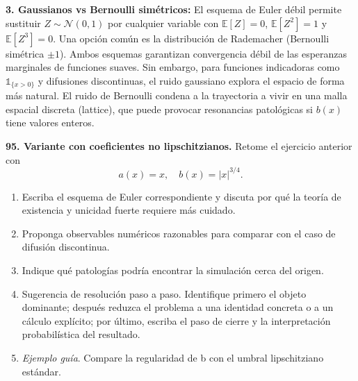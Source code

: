 \documentclass[11pt, letterpaper]{article}
\begin{document}
\begin{solucion}
    \textbf{3. Gaussianos vs Bernoulli simétricos:}
    El esquema de Euler débil permite sustituir $Z \sim \mathcal{N}(0,1)$ por cualquier variable con $\mathbb{E}[Z]=0$, $\mathbb{E}[Z^2]=1$ y $\mathbb{E}[Z^3]=0$. Una opción común es la distribución de Rademacher (Bernoulli simétrica $\pm 1$).
    Ambos esquemas garantizan convergencia débil de las esperanzas marginales de funciones suaves. Sin embargo, para funciones indicadoras como $\mathbb{1}_{\{x > 0\}}$ y difusiones discontinuas, el ruido gaussiano explora el espacio de forma más natural. El ruido de Bernoulli condena a la trayectoria a vivir en una malla espacial discreta (lattice), que puede provocar resonancias patológicas si $b(x)$ tiene valores enteros.
\end{solucion}

\newpage

\begin{ejercicio}
    \textbf{95. Variante con coeficientes no lipschitzianos.} Retome el ejercicio anterior con
    \[ a(x)=x, \quad b(x)=|x|^{3/4}. \]
    \begin{enumerate}
        \item Escriba el esquema de Euler correspondiente y discuta por qué la teoría de existencia y unicidad fuerte requiere más cuidado.
        \item Proponga observables numéricos razonables para comparar con el caso de difusión discontinua.
        \item Indique qué patologías podría encontrar la simulación cerca del origen.
        \item Sugerencia de resolución paso a paso. Identifique primero el objeto dominante; después reduzca el problema a una identidad concreta o a un cálculo explícito; por último, escriba el paso de cierre y la interpretación probabilística del resultado.
        \item \textit{Ejemplo guía}. Compare la regularidad de b con el umbral lipschitziano estándar.
    \end{enumerate}
\end{ejercicio}

\vspace{5mm}
\end{document}
